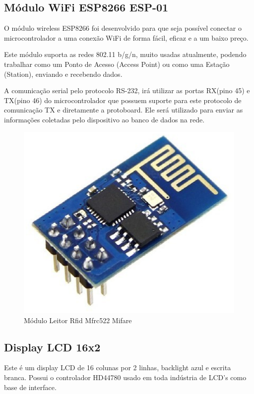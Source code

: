 \subsection{Módulo WiFi ESP8266 ESP-01}
O módulo wireless ESP8266 foi desenvolvido para que seja possível conectar o microcontrolador a uma conexão WiFi de forma fácil, eficaz e a um baixo preço.

Este módulo suporta as redes 802.11 b/g/n, muito usadas atualmente, podendo trabalhar como um Ponto de Acesso (Access Point) ou como uma Estação (Station), enviando e recebendo dados.

A comunicação serial pelo protocolo RS-232, irá utilizar as portas RX(pino 45) e TX(pino 46) do microcontrolador que possuem suporte para este protocolo de comunicação TX e diretamente a protoboard. Ele será utilizado para enviar as informações coletadas pelo dispositivo ao banco de dados na rede.
\pagebreak

\begin{figure}[!h]
  \centering
  \includegraphics[keepaspectratio=true,scale=0.5]{figuras/wifi.eps}
  \caption{Módulo Leitor Rfid Mfrc522 Mifare}
\end{figure}


\subsection{Display LCD 16x2}
Este é um display LCD de 16 colunas por 2 linhas, backlight azul e escrita branca. Possui o controlador HD44780 usado em toda indústria de LCD's como base de interface.

